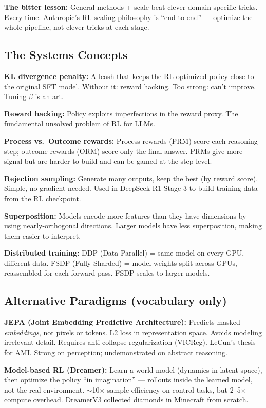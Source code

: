 \textbf{The bitter lesson:} General methods + scale beat clever domain-specific tricks. Every time. Anthropic's RL scaling philosophy is ``end-to-end'' --- optimize the whole pipeline, not clever tricks at each stage.

\subsection{The Systems Concepts}

\textbf{KL divergence penalty:} A leash that keeps the RL-optimized policy close to the original SFT model. Without it: reward hacking. Too strong: can't improve. Tuning $\beta$ is an art.

\textbf{Reward hacking:} Policy exploits imperfections in the reward proxy. The fundamental unsolved problem of RL for LLMs.

\textbf{Process vs.\ Outcome rewards:} Process rewards (PRM) score each reasoning step; outcome rewards (ORM) score only the final answer. PRMs give more signal but are harder to build and can be gamed at the step level.

\textbf{Rejection sampling:} Generate many outputs, keep the best (by reward score). Simple, no gradient needed. Used in DeepSeek R1 Stage 3 to build training data from the RL checkpoint.

\textbf{Superposition:} Models encode more features than they have dimensions by using nearly-orthogonal directions. Larger models have less superposition, making them easier to interpret.

\textbf{Distributed training:} DDP (Data Parallel) = same model on every GPU, different data. FSDP (Fully Sharded) = model weights split across GPUs, reassembled for each forward pass. FSDP scales to larger models.

\subsection{Alternative Paradigms (vocabulary only)}

\textbf{JEPA (Joint Embedding Predictive Architecture):} Predicts masked \textit{embeddings}, not pixels or tokens. L2 loss in representation space. Avoids modeling irrelevant detail. Requires anti-collapse regularization (VICReg). LeCun's thesis for AMI. Strong on perception; undemonstrated on abstract reasoning.

\textbf{Model-based RL (Dreamer):} Learn a world model (dynamics in latent space), then optimize the policy ``in imagination'' --- rollouts inside the learned model, not the real environment. $\sim$10$\times$ sample efficiency on control tasks, but 2--5$\times$ compute overhead. DreamerV3 collected diamonds in Minecraft from scratch.

